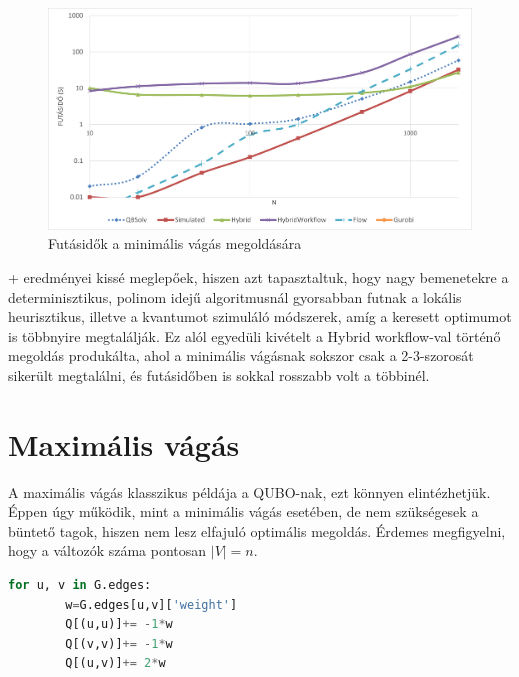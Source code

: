 \begin{figure}[!ht]
	\centering
	\includegraphics[width=150mm, keepaspectratio]{figures/diagrams/minCutRuntimes.png}
	\caption{Futásidők a minimális vágás megoldására}
	\label{fig:minCutRuntimes}
\end{figure}

\Az+ eredményei kissé meglepőek, hiszen azt tapasztaltuk, hogy nagy bemenetekre a determinisztikus, polinom idejű algoritmusnál gyorsabban futnak a lokális heurisztikus, illetve a kvantumot szimuláló módszerek, amíg a keresett optimumot is többnyire megtalálják. Ez alól egyedüli kivételt a Hybrid workflow-val történő megoldás produkálta, ahol a minimális vágásnak sokszor csak a 2-3-szorosát sikerült megtalálni, és futásidőben is sokkal rosszabb volt a többinél.

\section{Maximális vágás}\label{sec:practiceMaxCut}

A maximális vágás klasszikus példája a QUBO-nak, ezt könnyen elintézhetjük.
Éppen úgy működik, mint a minimális vágás esetében, de nem szükségesek a büntető tagok, hiszen nem lesz elfajuló optimális megoldás.
Érdemes megfigyelni, hogy a változók száma pontosan $|V|=n$.

\begin{lstlisting}[language=python,caption=Maximális vágás QUBO előállítása,label=code:maxCutQUBO]
	for u, v in G.edges:
		w=G.edges[u,v]['weight']
		Q[(u,u)]+= -1*w
		Q[(v,v)]+= -1*w
		Q[(u,v)]+= 2*w
\end{lstlisting}


